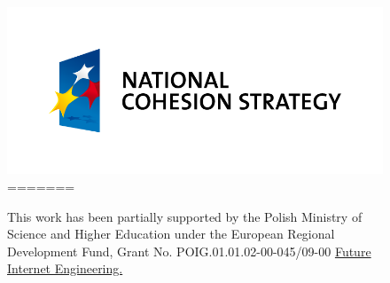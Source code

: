 \begin{figure}[ht]
\begin{minipage}[b]{0.33\linewidth}
\centering
\includegraphics[scale=0.45]{logo-nss}
=======
\vspace{1cm}

\noindent
This work has been partially supported by the Polish Ministry of
Science and Higher Education under the European Regional Development
Fund, Grant No. POIG.01.01.02-00-045/09-00 
\href{https://www.iip.net.pl/en/project}{Future Internet Engineering.}


\end{minipage}
\end{figure}
